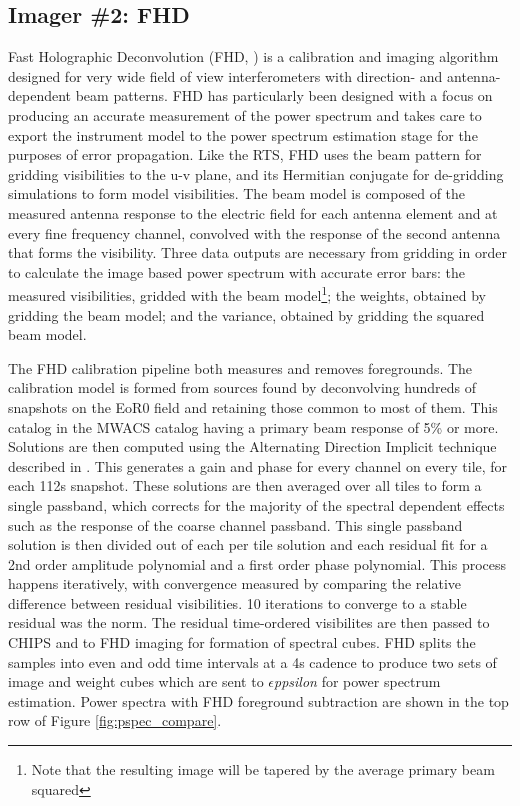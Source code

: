 \documentclass[preprint]{aastex}
\def\eppsilon{{\it $\epsilon$ppsilon }}
\begin{document}
\subsection{Imager \#2: FHD}
Fast Holographic Deconvolution (FHD, \cite{Sullivan:2012p9457}) is a calibration and imaging algorithm designed for very wide field of view interferometers with direction- and antenna-dependent beam patterns. FHD has particularly been designed with a focus on producing an accurate measurement of the power spectrum and takes care to export the instrument model to the power spectrum estimation stage for the purposes of error propagation. Like the RTS, FHD uses the  beam pattern for gridding visibilities to the u-v plane, and its Hermitian conjugate for de-gridding simulations to form model visibilities. The  beam model is composed of the measured antenna response to the electric field for each antenna element and at every fine frequency channel, convolved with the response of the second antenna that forms the visibility. Three data outputs are necessary from gridding in order to calculate the image based power spectrum with accurate error bars: the measured visibilities, gridded with the  beam model\footnote{Note that the resulting image will be tapered by the average primary beam squared}; the weights, obtained by gridding the  beam model; and the variance, obtained by gridding the squared beam model.

The FHD calibration pipeline both measures and removes foregrounds. The calibration model is formed from sources found by deconvolving hundreds of snapshots on the EoR0 field and retaining those common to most of them.  This catalog  in the MWACS catalog having a primary beam response of 5\% or more. Solutions are then computed using the Alternating Direction Implicit technique described in \citet{sal14}.  This generates a gain and phase for every channel on every tile, for each 112s snapshot.  These solutions are then averaged over all tiles to form a single passband, which corrects for the majority of the spectral dependent effects such as the response of the coarse channel passband.  This single passband solution is then divided out of each per tile solution and each residual fit for a 2nd order amplitude polynomial and a first order phase polynomial. This process happens iteratively, with convergence measured by comparing the relative difference between residual visibilities. 10 iterations to converge to a stable residual was the norm. The residual time-ordered visibilites are then passed to CHIPS and to FHD imaging for formation of spectral cubes.  FHD splits the samples into even and odd time intervals at a 4s cadence to produce two sets of image and weight cubes which are sent to \eppsilon for power spectrum estimation.  Power spectra with FHD foreground subtraction are shown in the top row of Figure \ref{fig:pspec_compare}.
\end{document}
